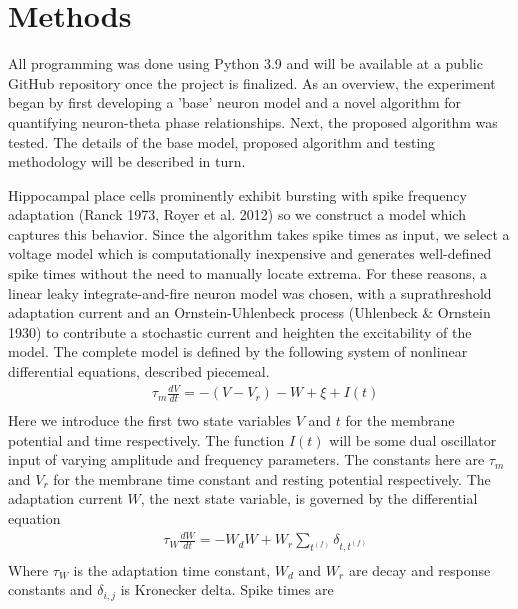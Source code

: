 \documentclass[12pt, letterpaper]{article}
\newenvironment{collapsable}{}{}
\begin{document}
\begin{collapsable}
  \section*{\normalfont\normalsize\bf Methods}
  All programming was done using Python 3.9 and will be available at a public
  GitHub repository once the project is finalized. As an overview, the
  experiment began by first developing a 'base' neuron model and a novel algorithm
  for quantifying neuron-theta phase relationships. Next, the proposed algorithm was
  tested. The details of the base model, proposed algorithm and testing
  methodology will be described in turn.

  \vspace{12pt}

  Hippocampal place cells prominently exhibit bursting with spike frequency
  adaptation (Ranck 1973, Royer et al. 2012) so we construct a model which captures this behavior. Since the
  algorithm takes spike times as input, we select a voltage model which is
  computationally inexpensive and generates well-defined spike times without the
  need to manually locate extrema. For these reasons, a linear leaky
  integrate-and-fire neuron model was chosen, with a suprathreshold adaptation
  current and an Ornstein-Uhlenbeck process (Uhlenbeck \& Ornstein 1930) to
  contribute a stochastic current and heighten the excitability of the model.
  The complete model is defined by the following system of nonlinear
  differential equations, described piecemeal.
  \begin{align*}
    &\tau_m\frac{dV}{dt}=-(V-V_r)-W+\xi+I(t)\tag{5}\\
  \end{align*}
  \noindent Here we introduce the first two state variables $V$ and $t$ for the
  membrane potential and time respectively. The function $I(t)$ will be some dual
  oscillator input of varying amplitude and frequency parameters. The constants
  here are $\tau_m$ and $V_r$ for the membrane time constant and resting
  potential respectively. The adaptation current $W$, the next state variable, is governed by the
  differential equation
  \begin{align*}
    &\tau_W\frac{dW}{dt}=-W_dW+W_r\sum_{t^{(f)}}\delta_{t,t^{(f)}}\tag{6}\\
  \end{align*}
  Where $\tau_W$ is the adaptation time constant, $W_d$ and $W_r$ are decay and
  response constants and $\delta_{i,j}$ is Kronecker delta. Spike times are

\end{collapsable}
\end{document}
